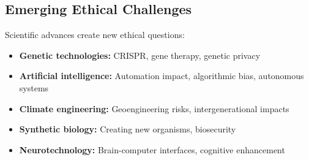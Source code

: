 
\subsection{Emerging Ethical Challenges}

Scientific advances create new ethical questions:

\begin{itemize}
    \item \textbf{Genetic technologies:} CRISPR, gene therapy, genetic privacy
    \item \textbf{Artificial intelligence:} Automation impact, algorithmic bias, autonomous systems
    \item \textbf{Climate engineering:} Geoengineering risks, intergenerational impacts
    \item \textbf{Synthetic biology:} Creating new organisms, biosecurity
    \item \textbf{Neurotechnology:} Brain-computer interfaces, cognitive enhancement
\end{itemize}

